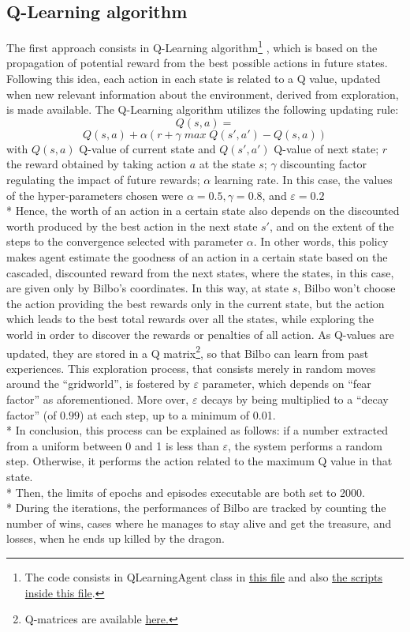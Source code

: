 \subsection{Q-Learning algorithm}
The first approach consists in Q-Learning algorithm\footnote{The code consists in QLearningAgent class in \href{https://github.com/moiraghif/DragonHunting/blob/master/Bilbo\%20World/agents.py}{this file} and also \href{https://github.com/moiraghif/DragonHunting/blob/master/Bilbo\%20World/Bilbo_q_learning.py}{the scripts inside this file}.} \cite{2}, which is based on the propagation of potential reward from the best possible actions in future states. Following this idea, each action in each state is related to a Q value, updated when new relevant information about the environment, derived from exploration, is made available. The Q-Learning algorithm utilizes the following updating rule:
$$Q(s,a)=$$ 
$$Q(s,a)+\alpha(r+\gamma\;max\;Q(s',a') - Q(s,a))$$
with $Q(s,a)$ Q-value of current state and $Q(s',a')$ Q-value of next state; $r$ the reward obtained by taking action $a$ at the state $s$; $\gamma$ discounting factor regulating the impact of future rewards; $\alpha$ learning rate. In this case, the values of the hyper-parameters chosen were $\alpha=0.5, \gamma=0.8$, and $\varepsilon=0.2$\\*
Hence, the worth of an action in a certain state also depends on the discounted worth produced by the best action in the next state $s'$, and on the extent of the steps to the convergence selected with parameter $\alpha$. In other words, this policy makes agent estimate the goodness of an action in a certain state based on the cascaded, discounted reward from the next states, where the states, in this case, are given only by Bilbo's coordinates. 
In this way, at state $s$, Bilbo won't choose the action providing the best rewards only in the current state, but the action which leads to the best total rewards over all the states, while exploring the world in order to discover the rewards or penalties of all action. As Q-values are updated, they are stored in a Q matrix\footnote{Q-matrices are available \href{https://github.com/moiraghif/DragonHunting/tree/master/Bilbo\%20World/models}{here.}}, so that Bilbo can learn from past experiences. This exploration process, that consists merely in random moves around the ``gridworld'', is fostered by $\varepsilon$ parameter, which depends on ``fear factor'' as aforementioned. More over, $\varepsilon$ decays by being multiplied to a ``decay factor'' (of $0.99$) at each step, up to a minimum of 0.01.\\*
In conclusion, this process can be explained as follows: if a number extracted from a uniform between 0 and 1 is less than $\varepsilon$, the system performs a random step. Otherwise, it performs the action related to the maximum Q value in that state.\\* 
Then, the limits of epochs and episodes executable are both set to 2000.\\*
During the iterations, the performances of Bilbo are tracked by counting the number of wins, cases where he manages to stay alive and get the treasure, and losses, when he ends up killed by the dragon.


